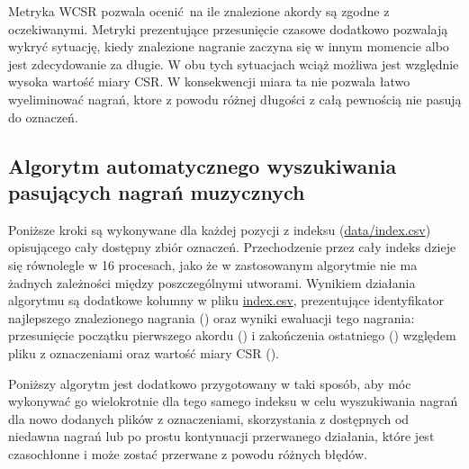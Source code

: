 Metryka WCSR pozwala ocenić na ile znalezione akordy są zgodne z oczekiwanymi. Metryki prezentujące
przesunięcie czasowe dodatkowo pozwalają wykryć sytuację, kiedy znalezione nagranie zaczyna się w
innym momencie albo jest zdecydowanie za długie. W obu tych sytuacjach wciąż możliwa jest względnie
wysoka wartość miary CSR. W konsekwencji miara ta nie pozwala łatwo wyeliminować nagrań, ktore z
powodu różnej długości z całą pewnością nie pasują do oznaczeń.

\subsection{Algorytm automatycznego wyszukiwania pasujących nagrań muzycznych}
Poniższe kroki są wykonywane dla każdej pozycji z indeksu (\url{data/index.csv}) opisującego cały
dostępny zbiór oznaczeń. Przechodzenie przez cały indeks dzieje się równolegle w 16 procesach, jako
że w zastosowanym algorytmie nie ma żadnych zależności między poszczególnymi utworami. Wynikiem
działania algorytmu są dodatkowe kolumny w pliku \url{index.csv}, prezentujące identyfikator
najlepszego znalezionego nagrania () oraz wyniki ewaluacji tego nagrania:
przesunięcie początku pierwszego akordu () i zakończenia ostatniego
() względem pliku z oznaczeniami oraz wartość miary CSR ().

Poniższy algorytm jest dodatkowo przygotowany w taki sposób, aby móc wykonywać go wielokrotnie dla
tego samego indeksu w celu wyszukiwania nagrań dla nowo dodanych plików z oznaczeniami, skorzystania
z dostępnych od niedawna nagrań lub po prostu kontynuacji przerwanego działania, które jest
czasochłonne i może zostać przerwane z powodu różnych błędów.

